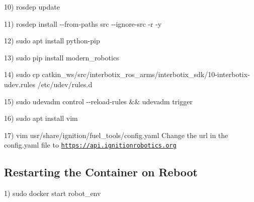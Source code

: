 10) {\ttfamily rosdep update} ~\newline


11) {\ttfamily rosdep install -\/-\/from-\/paths src -\/-\/ignore-\/src -\/r -\/y} ~\newline


12) {\ttfamily sudo apt install python-\/pip} ~\newline


13) {\ttfamily sudo pip install modern\+\_\+robotics} ~\newline


14) {\ttfamily sudo cp catkin\+\_\+ws/src/interbotix\+\_\+ros\+\_\+arms/interbotix\+\_\+sdk/10-\/interbotix-\/udev.\+rules /etc/udev/rules.d} ~\newline


15) {\ttfamily sudo udevadm control -\/-\/reload-\/rules \&\& udevadm trigger} ~\newline


16) {\ttfamily sudo apt install vim} ~\newline


17) {\ttfamily vim usr/share/ignition/fuel\+\_\+tools/config.\+yaml} Change the url in the config.\+yaml file to {\ttfamily \href{https://api.ignitionrobotics.org}{\tt https\+://api.\+ignitionrobotics.\+org}}

\subsection*{Restarting the Container on Reboot}

1) {\ttfamily sudo docker start robot\+\_\+env} 